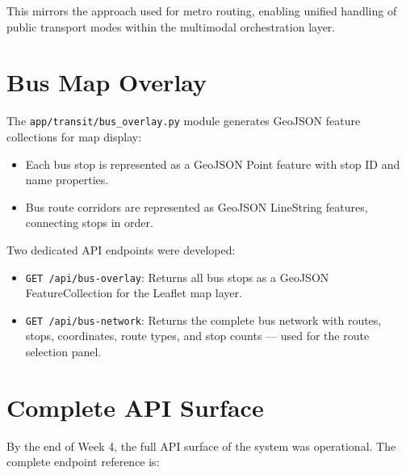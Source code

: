 \documentclass[12pt, a4paper]{report}
\begin{document}
This mirrors the approach used for metro routing, enabling unified handling of public transport modes within the multimodal orchestration layer.

\section{Bus Map Overlay}

The \texttt{app/transit/bus\_overlay.py} module generates GeoJSON feature collections for map display:

\begin{itemize}
    \item Each bus stop is represented as a GeoJSON Point feature with stop ID and name properties.
    \item Bus route corridors are represented as GeoJSON LineString features, connecting stops in order.
\end{itemize}

Two dedicated API endpoints were developed:

\begin{itemize}
    \item \texttt{GET /api/bus-overlay}: Returns all bus stops as a GeoJSON FeatureCollection for the Leaflet map layer.
    \item \texttt{GET /api/bus-network}: Returns the complete bus network with routes, stops, coordinates, route types, and stop counts — used for the route selection panel.
\end{itemize}

\section{Complete API Surface}

By the end of Week 4, the full API surface of the system was operational. The complete endpoint reference is:
\end{document}
